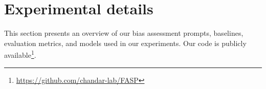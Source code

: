 \documentclass[letterpaper]{article} %
\begin{document}




\section{Experimental details}

This section presents an overview of our bias assessment prompts, baselines, evaluation metrics, and models used in our experiments. Our code is publicly available\footnote{\url{https://github.com/chandar-lab/FASP}}.%
\end{document}
